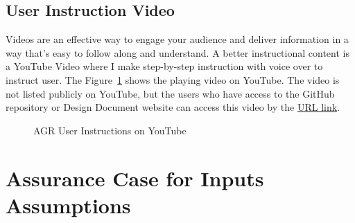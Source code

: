 \subsection{User Instruction Video}
Videos are an effective way to engage your audience and deliver information in a way that's easy to follow along and understand. A better instructional content is a YouTube Video where I make step-by-step instruction with voice over to instruct user. The Figure~\ref{fig_video} shows the playing video on YouTube. The video is not listed publicly on YouTube, but the users who have access to the GitHub repository or Design Document website can access this video by the \href{https://www.youtube.com/watch?v=1eK5k6bazNs}{URL link}.

\begin{figure}[H]
    \centering
    \caption[AGR User Instructions on YouTube]{AGR User Instructions on YouTube}
    \label{fig_video}
\end{figure}


\section{Assurance Case for Inputs Assumptions}

